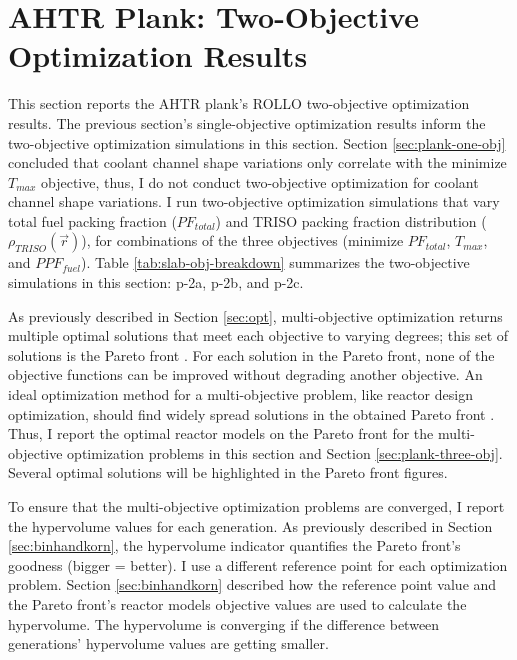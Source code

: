 \section{AHTR Plank: Two-Objective Optimization Results}
\label{sec:plank-two-obj}
This section reports the \gls{AHTR} plank's \gls{ROLLO} two-objective optimization 
results. 
The previous section's single-objective optimization results inform the two-objective 
optimization simulations in this section.
Section \ref{sec:plank-one-obj} concluded that coolant channel shape variations 
only correlate with the minimize $T_{max}$ objective, thus, I do not conduct 
two-objective optimization for coolant channel shape variations.
I run two-objective optimization simulations that vary total fuel packing 
fraction ($PF_{total}$) and \gls{TRISO} packing fraction distribution 
($\rho_{TRISO}(\vec{r})$), for combinations of the three objectives (minimize 
$PF_{total}$, $T_{max}$, and $PPF_{fuel}$). 
Table \ref{tab:slab-obj-breakdown} summarizes the two-objective simulations in 
this section: p-2a, p-2b, and p-2c.

As previously described in Section \ref{sec:opt}, multi-objective optimization returns 
multiple optimal solutions that meet each objective to varying degrees; this set of 
solutions is the Pareto front \cite{deb_multi-objective_2001}. 
For each solution in the Pareto front, none of the objective functions can be 
improved without degrading another objective.
An ideal optimization method for a multi-objective problem, like reactor design 
optimization, should find widely spread solutions in the obtained Pareto front 
\cite{deb_multi-objective_2001}. 
Thus, I report the optimal reactor models on the Pareto front for the multi-objective 
optimization problems in this section and Section \ref{sec:plank-three-obj}. 
Several optimal solutions will be highlighted in the Pareto front figures. 

To ensure that the multi-objective optimization problems are converged, I report the 
hypervolume values for each generation. 
As previously described in Section \ref{sec:binhandkorn}, the hypervolume indicator 
quantifies the Pareto front's goodness (bigger = better).
I use a different reference point for each optimization problem.
Section \ref{sec:binhandkorn} described how the reference point value and 
the Pareto front's reactor models objective values are used to calculate the 
hypervolume. 
The hypervolume is converging if the difference between generations' hypervolume values 
are getting smaller. 


